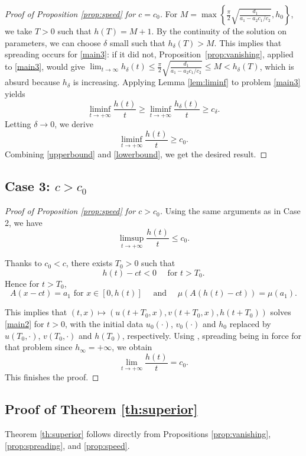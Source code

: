 \documentclass[reqno]{amsart}
\newcommand{\rev}[1]{#1}
\theoremstyle{plain}
\theoremstyle{definition}
\theoremstyle{remark}
\begin{document}
\begin{proof}[Proof of Proposition \ref{prop:speed} for $c = c_0$]
		For $M=\max\left\{\frac{\pi}{2}\sqrt{\frac{d_1}{a_1-a_2c_1/c_2}}, h_0\right\}$, we take $T>0$ such that $h(T) = M+1$. By the continuity of the solution on parameters, we can choose $\delta$ small such that $h_\delta(T) > M$. \rev{This implies that spreading occurs for \eqref{main3}: if it did not, Proposition~\ref{prop:vanishing}, applied to \eqref{main3}, would give $\lim_{t\to\infty}h_\delta(t)\le\frac{\pi}{2}\sqrt{\frac{d_1}{a_1-a_2c_1/c_2}}\le M<h_\delta(T)$, which is absurd because $h_\delta$ is increasing.} Applying Lemma \ref{lem:liminf} to problem \eqref{main3} yields
		\[
		\liminf_{t \to +\infty} \frac{h(t)}{t} \ge \liminf_{t \to +\infty} \frac{h_\delta(t)}{t} \ge c_\delta.
		\]
		Letting $\delta\to 0$, we derive
		\begin{equation}\label{lowerbound}
			\liminf_{t\to+\infty} \frac{h(t)}{t} \ge c_0.
		\end{equation}
		Combining \eqref{upperbound} and \eqref{lowerbound}, we get the desired result.
	\end{proof}
	
	\subsection{Case 3: $c > c_0$}
	
	\begin{proof}[Proof of Proposition \ref{prop:speed} for $c > c_0$]
		Using the same arguments as in Case 2, we have
		\[
		\limsup_{t\to+\infty} \frac{h(t)}{t} \le c_0.
		\]
		
		Thanks to $c_0<c$, there exists $T_0>0$ such that
		\[
		h(t) - ct < 0 \quad \text{ for } t> T_0.
		\]
		Hence for $t>T_0$,
		\[
		A(x-ct) = a_1 \text{ for } x \in [0,h(t)]
		\quad\text{ and }\quad
		\mu(A(h(t)-ct)) = \mu(a_1).
		\]
		
		This implies that $(t,x) \mapsto (u(t+T_0, x), v(t+T_0, x), h(t+T_0))$ solves \eqref{main2} for $t > 0$, with the initial data $u_0(\cdot)$, $v_0(\cdot)$ and $h_0$ replaced by $u(T_0,\cdot)$, $v(T_0,\cdot)$ and $h(T_0)$, respectively. Using \rev{\cite[Theorem 1.1]{MR3609207}, spreading being in force for that problem since $h_\infty=+\infty$}, we obtain
		\[
		\lim_{t\to+\infty} \frac{h(t)}{t} = c_0.
		\]
		This finishes the proof.
	\end{proof}
	
	\subsection{Proof of Theorem \ref{th:superior}}
	Theorem \ref{th:superior} follows directly from Propositions \ref{prop:vanishing}, \ref{prop:spreading}, and \ref{prop:speed}.
	
\end{document}
